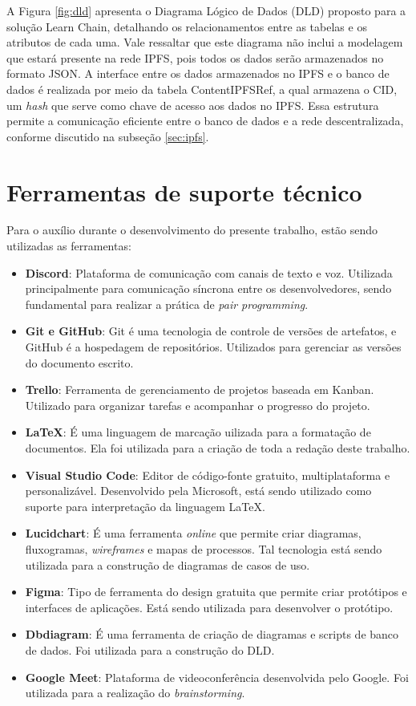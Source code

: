 A Figura \ref{fig:dld} apresenta o Diagrama Lógico de Dados (DLD) proposto para a solução Learn Chain, detalhando os relacionamentos entre as tabelas e os atributos de cada uma. Vale ressaltar que este diagrama não inclui a modelagem que estará presente na rede IPFS, pois todos os dados serão armazenados no formato JSON. A interface entre os dados armazenados no IPFS e o banco de dados é realizada por meio da tabela ContentIPFSRef, a qual armazena o CID, um \textit{hash} que serve como chave de acesso aos dados no IPFS. Essa estrutura permite a comunicação eficiente entre o banco de dados e a rede descentralizada, conforme discutido na subseção \ref{sec:ipfs}.

\section{Ferramentas de suporte técnico}
Para o auxílio durante o desenvolvimento do presente trabalho, estão sendo utilizadas as ferramentas:

\begin{itemize}
    \item \textbf{Discord}: Plataforma de comunicação com canais de texto e voz. Utilizada principalmente para comunicação síncrona entre os desenvolvedores, sendo fundamental para realizar a prática de \textit{pair programming}.
    \item \textbf{Git e GitHub}: Git é uma tecnologia de controle de versões de artefatos, e GitHub é a hospedagem de repositórios. Utilizados para gerenciar as versões do documento escrito.
    \item \textbf{Trello}: Ferramenta de gerenciamento de projetos baseada em Kanban. Utilizado para organizar tarefas e acompanhar o progresso do projeto.
    \item \textbf{LaTeX}: É uma linguagem de marcação uilizada para a formatação de documentos. Ela foi utilizada para a criação de toda a redação deste trabalho.
    \item \textbf{Visual Studio Code}: Editor de código-fonte gratuito, multiplataforma e personalizável. Desenvolvido pela Microsoft, está sendo utilizado como suporte para interpretação da linguagem LaTeX.
    \item \textbf{Lucidchart}: É uma ferramenta \textit{online} que permite criar diagramas, fluxogramas, \textit{wireframes} e mapas de processos. Tal tecnologia está sendo utilizada para a construção de diagramas de casos de uso.
    \item \textbf{Figma}: Tipo de ferramenta do design gratuita que permite criar protótipos e interfaces de aplicações. Está sendo utilizada para desenvolver o protótipo.
    \item \textbf{Dbdiagram}: É uma ferramenta de criação de diagramas e scripts de banco de dados. Foi utilizada para a construção do DLD.
    \item \textbf{Google Meet}: Plataforma de videoconferência desenvolvida pelo Google. Foi utilizada para a realização do \textit{brainstorming}.
\end{itemize}